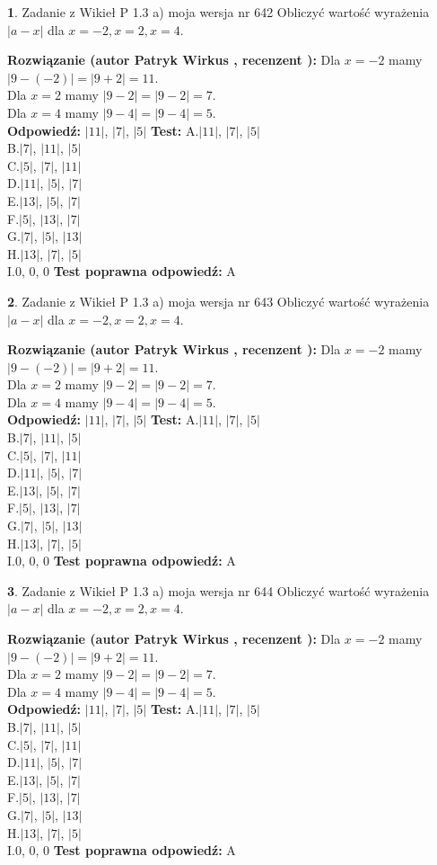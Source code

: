 \documentclass[12pt, a4paper]{article}
\theoremstyle{definition} %
\newtheorem{zad}{}
\newcommand{\zadStart}[1]{\begin{zad}#1\newline}
\newcommand{\zadStop}{\end{zad}}
\newcommand{\rozwStart}[2]{\noindent \textbf{Rozwiązanie (autor #1 , recenzent #2): }\newline}
\newcommand{\rozwStop}{\newline}
\newcommand{\odpStart}{\noindent \textbf{Odpowiedź:}\newline}
\newcommand{\odpStop}{\newline}
\newcommand{\testStart}{\noindent \textbf{Test:}\newline}
\newcommand{\testStop}{\newline}
\newcommand{\kluczStart}{\noindent \textbf{Test poprawna odpowiedź:}\newline}
\newcommand{\kluczStop}{\newline}
\begin{document}
\zadStart{Zadanie z Wikieł P 1.3 a) moja wersja nr 642}
Obliczyć wartość wyrażenia $|a - x|$ dla $x=-2,x=2,x=4$.
\zadStop
\rozwStart{Patryk Wirkus}{}
Dla $x = -2$ mamy $|9 - (-2)| = |9 + 2| = 11$.\\
Dla $x = 2$ mamy $|9 - 2| = |9 - 2| = 7$.\\
Dla $x = 4$ mamy $|9 - 4| = |9 - 4| = 5$.\\
\rozwStop
\odpStart
$|11|$, $|7|$, $|5|$
\odpStop
\testStart
A.$|11|$, $|7|$, $|5|$\\
B.$|7|$, $|11|$, $|5|$\\
C.$|5|$, $|7|$, $|11|$\\
D.$|11|$, $|5|$, $|7|$\\
E.$|13|$, $|5|$, $|7|$\\
F.$|5|$, $|13|$, $|7|$\\
G.$|7|$, $|5|$, $|13|$\\
H.$|13|$, $|7|$, $|5|$\\
I.$0$, $0$, $0$
\testStop
\kluczStart
A
\kluczStop



\zadStart{Zadanie z Wikieł P 1.3 a) moja wersja nr 643}
Obliczyć wartość wyrażenia $|a - x|$ dla $x=-2,x=2,x=4$.
\zadStop
\rozwStart{Patryk Wirkus}{}
Dla $x = -2$ mamy $|9 - (-2)| = |9 + 2| = 11$.\\
Dla $x = 2$ mamy $|9 - 2| = |9 - 2| = 7$.\\
Dla $x = 4$ mamy $|9 - 4| = |9 - 4| = 5$.\\
\rozwStop
\odpStart
$|11|$, $|7|$, $|5|$
\odpStop
\testStart
A.$|11|$, $|7|$, $|5|$\\
B.$|7|$, $|11|$, $|5|$\\
C.$|5|$, $|7|$, $|11|$\\
D.$|11|$, $|5|$, $|7|$\\
E.$|13|$, $|5|$, $|7|$\\
F.$|5|$, $|13|$, $|7|$\\
G.$|7|$, $|5|$, $|13|$\\
H.$|13|$, $|7|$, $|5|$\\
I.$0$, $0$, $0$
\testStop
\kluczStart
A
\kluczStop



\zadStart{Zadanie z Wikieł P 1.3 a) moja wersja nr 644}
Obliczyć wartość wyrażenia $|a - x|$ dla $x=-2,x=2,x=4$.
\zadStop
\rozwStart{Patryk Wirkus}{}
Dla $x = -2$ mamy $|9 - (-2)| = |9 + 2| = 11$.\\
Dla $x = 2$ mamy $|9 - 2| = |9 - 2| = 7$.\\
Dla $x = 4$ mamy $|9 - 4| = |9 - 4| = 5$.\\
\rozwStop
\odpStart
$|11|$, $|7|$, $|5|$
\odpStop
\testStart
A.$|11|$, $|7|$, $|5|$\\
B.$|7|$, $|11|$, $|5|$\\
C.$|5|$, $|7|$, $|11|$\\
D.$|11|$, $|5|$, $|7|$\\
E.$|13|$, $|5|$, $|7|$\\
F.$|5|$, $|13|$, $|7|$\\
G.$|7|$, $|5|$, $|13|$\\
H.$|13|$, $|7|$, $|5|$\\
I.$0$, $0$, $0$
\testStop
\kluczStart
A
\kluczStop
\end{document}
